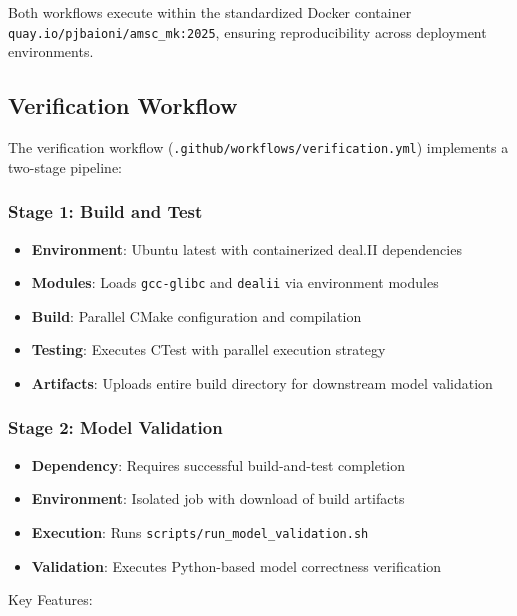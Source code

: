 \documentclass[11pt,a4paper]{article}
\begin{document}
Both workflows execute within the standardized Docker container \texttt{quay.io/pjbaioni/amsc\_mk:2025}, ensuring reproducibility across deployment environments.

\subsection{Verification Workflow}

The verification workflow (\texttt{.github/workflows/verification.yml}) implements a two-stage pipeline:

\subsubsection{Stage 1: Build and Test}
\begin{itemize}
    \item \textbf{Environment}: Ubuntu latest with containerized deal.II dependencies
    \item \textbf{Modules}: Loads \texttt{gcc-glibc} and \texttt{dealii} via environment modules
    \item \textbf{Build}: Parallel CMake configuration and compilation
    \item \textbf{Testing}: Executes CTest with parallel execution strategy
    \item \textbf{Artifacts}: Uploads entire build directory for downstream model validation
\end{itemize}

\subsubsection{Stage 2: Model Validation}
\begin{itemize}
    \item \textbf{Dependency}: Requires successful build-and-test completion
    \item \textbf{Environment}: Isolated job with download of build artifacts
    \item \textbf{Execution}: Runs \texttt{scripts/run\_model\_validation.sh}
    \item \textbf{Validation}: Executes Python-based model correctness verification
\end{itemize}

Key Features:
\end{document}
